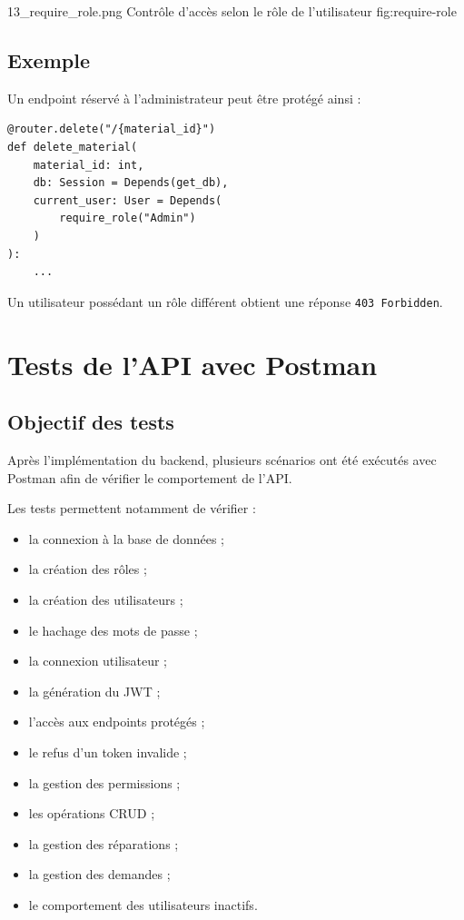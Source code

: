 \documentclass[12pt,a4paper]{report}
\begin{document}
\backendimage
{13_require_role.png}
{Contrôle d'accès selon le rôle de l'utilisateur}
{fig:require-role}

\section{Exemple}

Un endpoint réservé à l'administrateur peut être protégé ainsi :

\begin{lstlisting}
@router.delete("/{material_id}")
def delete_material(
    material_id: int,
    db: Session = Depends(get_db),
    current_user: User = Depends(
        require_role("Admin")
    )
):
    ...
\end{lstlisting}

Un utilisateur possédant un rôle différent obtient une réponse
\texttt{403 Forbidden}.


\chapter{Tests de l'API avec Postman}

\section{Objectif des tests}

Après l'implémentation du backend, plusieurs scénarios ont été
exécutés avec Postman afin de vérifier le comportement de l'API.

Les tests permettent notamment de vérifier :

\begin{itemize}
    \item la connexion à la base de données ;
    \item la création des rôles ;
    \item la création des utilisateurs ;
    \item le hachage des mots de passe ;
    \item la connexion utilisateur ;
    \item la génération du JWT ;
    \item l'accès aux endpoints protégés ;
    \item le refus d'un token invalide ;
    \item la gestion des permissions ;
    \item les opérations CRUD ;
    \item la gestion des réparations ;
    \item la gestion des demandes ;
    \item le comportement des utilisateurs inactifs.
\end{itemize}
\end{document}
